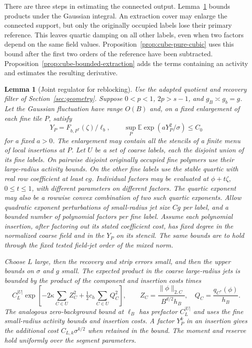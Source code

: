 \documentclass[11pt]{article}
\newtheorem{lemma}[theorem]{Lemma}
\theoremstyle{definition}
\newcommand{\E}{\mathbb E}
\begin{document}
There are three steps in estimating the connected output.
Lemma~\ref{lem:cube-joint-reblocking} bounds products under the
Gaussian integral. An extraction cover may enlarge the connected
support, but only the originally occupied labels lose their primary
reference. This leaves quartic damping on all other labels, even
when two factors depend on the same field values.
Proposition~\ref{prop:cube-pure-cubic} uses this bound after the
first two orders of the reference have been subtracted.
Proposition~\ref{prop:cube-bounded-extraction} adds the terms
containing an activity and estimates the resulting derivative.

\begin{lemma}[Joint regulator for reblocking]
\label{lem:cube-joint-reblocking}
Use the adapted quotient and recovery filter of
Section~\ref{sec:geometry}. Suppose \(0<p<1\), \(2p>s-1\),
and \(g_B\asymp g_b=g\). Let the Gaussian fluctuation have range
\(O(B)\) and, on a fixed enlargement of each fine tile \(P\), satisfy
\begin{equation}
 Y_P=F_{b,P^*}(\zeta)/\ell_b,\qquad
 \sup_P\E\exp(aY_P^2/\sigma)\le C_0
\end{equation}
for a fixed \(a>0\). The enlargement may contain all the stencils of
a finite menu of local insertions at \(P\). Let \(U\) be a set of
coarse labels, each the disjoint union of its fine labels. On
pairwise disjoint originally occupied fine polymers use their
large-radius activity bounds. On the other fine labels use the
stable quartic with real row coefficient at least \(c g\).
Individual factors may be evaluated at
\(\phi+t\zeta\), \(0\le t\le1\), with different parameters on
different factors. The quartic exponent may also be a rowwise
convex combination of two such quartic exponents. Allow quadratic
exponent perturbations of small-radius jet size \(C g\) per label,
and a bounded number of polynomial factors per fine label.
Assume each polynomial insertion, after factoring out its stated
coefficient cost, has fixed degree in the normalized coarse field
and in the \(Y_P\) on its stencil. The same bounds are to hold
through the fixed tested field-jet order of the mixed norm.

Choose \(L\) large, then the recovery and strip errors small,
and then the upper bounds on \(\sigma\) and \(g\) small.
The expected product in the coarse large-radius jets is bounded
by the product of the component and insertion costs times
\begin{equation}
 C_L^{|U|}
 \exp\left[-2\kappa\sum_{C\in U} Z_C^2+
                      \tfrac12 c_h\sum_{C\in U}Q_C^2\right],
 \qquad
 Z_C=\frac{\|\phi\|_{2,C}}{B^{d/2}h_B},
 \quad Q_C=\frac{q_{C^*}(\phi)}{h_B}.
\end{equation}
The analogous zero-background bound at \(\ell_B\) has prefactor
\(C_L^{|U|}\) and uses the fine small-radius activity bounds and
insertion costs. A factor \(Y_P^k\) in an insertion gives the
additional cost \(C_{L,k}\sigma^{k/2}\) when retained in the bound.
The moment and reserve hold uniformly over the segment parameters.
\end{lemma}
\end{document}
